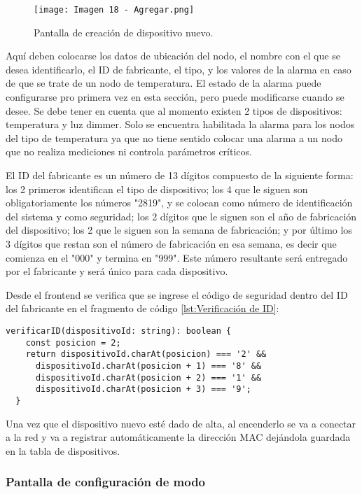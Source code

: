 \begin{figure}[h]
\centering
\texttt{[image: Imagen 18 - Agregar.png]}
\caption[Pantalla home]{Pantalla de creación de dispositivo nuevo. \footnotemark}
\label{fig:18}
\end{figure}

Aquí deben colocarse los datos de ubicación del nodo, el nombre con el que se desea identificarlo, el ID de fabricante, el tipo, y los valores de la alarma en caso de que se trate de un nodo de temperatura. El estado de la alarma puede configurarse pro primera vez en esta sección, pero puede modificarse cuando se desee. Se debe tener en cuenta que al momento existen 2 tipos de dispositivos: temperatura y luz dimmer. Solo se encuentra habilitada la alarma para los nodos del tipo de temperatura ya que no tiene sentido colocar una alarma a un nodo que no realiza mediciones ni controla parámetros críticos.

El ID del fabricante es un número de 13 dígitos compuesto de la siguiente forma: los 2 primeros identifican el tipo de dispositivo; los 4 que le siguen son obligatoriamente los números "2819", y se colocan como número de identificación del sistema y como seguridad; los 2 dígitos que le siguen son el año de fabricación del dispositivo; los 2 que le siguen son la semana de fabricación; y por último los 3 dígitos que restan son el número de fabricación en esa semana, es decir que comienza en el "000" y termina en "999". Este número resultante será entregado por el fabricante y será único para cada dispositivo.

Desde el frontend se verifica que se ingrese el código de seguridad dentro del ID del fabricante en el fragmento de código \ref{lst:Verificación de ID}:

\begin{lstlisting}[caption={Verificación de ID}, label={lst:Verificación de ID}]
verificarID(dispositivoId: string): boolean {
    const posicion = 2;
    return dispositivoId.charAt(posicion) === '2' &&
      dispositivoId.charAt(posicion + 1) === '8' &&
      dispositivoId.charAt(posicion + 2) === '1' &&
      dispositivoId.charAt(posicion + 3) === '9';
  }
\end{lstlisting}

Una vez que el dispositivo nuevo esté dado de alta, al encenderlo se va a conectar a la red y va a registrar automáticamente la dirección MAC dejándola guardada en la tabla de dispositivos.

\subsubsection{Pantalla de configuración de modo}

